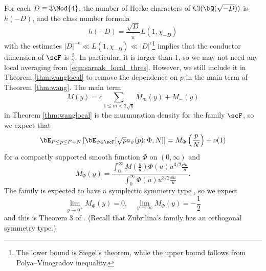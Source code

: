 For each $D \equiv 3 \Mod{4}$, the number of Hecke characters of $\mathrm{Cl}(\bQ(\sqrt{-D}))$ is $h(-D)$, and the class number formula
\[
h(-D) = \frac{\sqrt{D}}{\pi} L(1, \chi_{-D})
\]
with the estimates $|D|^{-\epsilon} \ll L(1, \chi_{-D}) \ll |D|^{\epsilon}$\footnote{The lower bound is Siegel's theorem, while the upper bound follows from Polya--Vinogradov inequality.} implies that the conductor dimension of $\scF$ is $\frac{3}{2}$.
In particular, it is larger than $1$, so we may not need any local averaging from \eqref{eqn:sarnak_local_thres}.
However, we still include it in Theorem \ref{thm:wanglocal} to remove the dependence on $p$ in the main term of Theorem \ref{thm:wang}.
The main term
\[
M(y) = \overline{c} \sum_{1 \le m < 2 \sqrt{y}} \overline{M}_m(y) + M_-(y)
\]
in Theorem \ref{thm:wanglocal} is the murmuration density for the family $\scF$, so we expect that
\begin{equation}
    \bE_{P \le p \le P + N}\left[\bE_{\psi \in \scF} [\sqrt{p} a_\psi(p); \Phi, N]\right] = M_\Phi\left(\frac{p}{N}\right) + o(1)
\end{equation}
for a compactly supported smooth function $\Phi$ on $(0, \infty)$ and
\begin{equation}
    M_\Phi(y) = \frac{\int_0^\infty M\left(\frac{y}{u}\right) \Phi(u) u^{3/2} \frac{\dd u}{u}}{\int_0^\infty \Phi(u) u^{3/2} \frac{\dd u}{u}}.
\end{equation}
The family is expected to have a symplectic symmetry type \cite{fouvry2003low,sarnak2016families}, so we expect
\[
\lim_{y \to 0^+} M_\Phi(y) = 0, \quad \lim_{y \to \infty} M_\Phi(y) = -\frac{1}{2}
\]
and this is Theorem 3 of \cite{wang2025murmurations}.
(Recall that Zubrilina's family has an orthogonal symmetry type.)